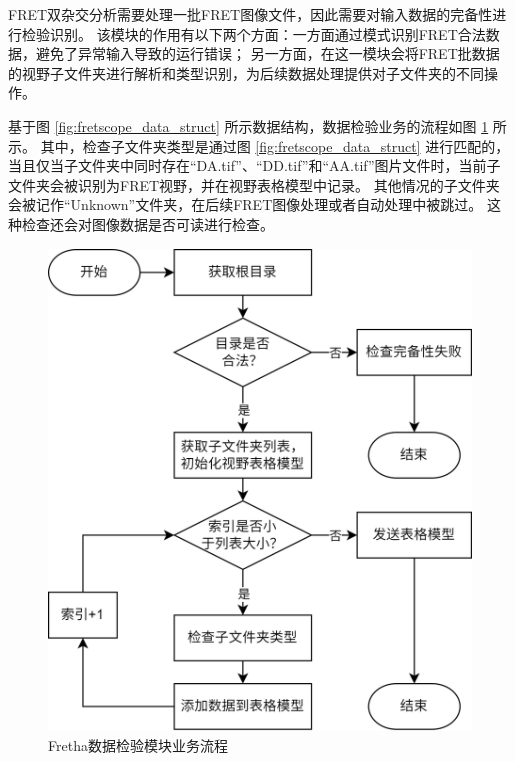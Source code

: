 FRET双杂交分析需要处理一批FRET图像文件，因此需要对输入数据的完备性进行检验识别。
该模块的作用有以下两个方面：一方面通过模式识别FRET合法数据，避免了异常输入导致的运行错误；
另一方面，在这一模块会将FRET批数据的视野子文件夹进行解析和类型识别，为后续数据处理提供对子文件夹的不同操作。

基于图 \ref{fig:fretscope_data_struct} 所示数据结构，数据检验业务的流程如图 \ref{fig:fretha_data_check_flow} 所示。
其中，检查子文件夹类型是通过图 \ref{fig:fretscope_data_struct} 进行匹配的，当且仅当子文件夹中同时存在“DA.tif”、“DD.tif”和“AA.tif”图片文件时，当前子文件夹会被识别为FRET视野，并在视野表格模型中记录。
其他情况的子文件夹会被记作“Unknown”文件夹，在后续FRET图像处理或者自动处理中被跳过。
这种检查还会对图像数据是否可读进行检查。
\begin{figure}[htbp]
    \centering
    \includegraphics[width=0.65\linewidth]{../figures/2/Fretha业务-数据检验.drawio.png}
    \caption{Fretha数据检验模块业务流程}
    \label{fig:fretha_data_check_flow}
\end{figure}

